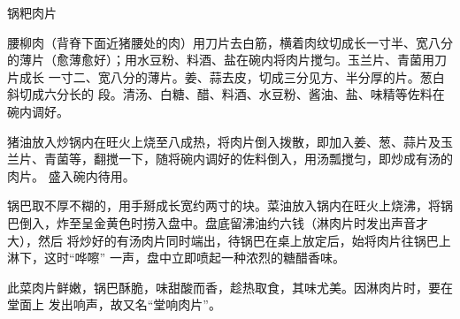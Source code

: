 \begin{recipe}{锅粑肉片}

\ingredients


\cooking

\step 腰柳肉（背脊下面近猪腰处的肉）用刀片去白筋，横着肉纹切成长一寸半、宽八分
的薄片（愈薄愈好）；用水豆粉、料酒、盐在碗内将肉片搅匀。玉兰片、青菌用刀片成长
一寸二、宽八分的薄片。姜、蒜去皮，切成三分见方、半分厚的片。葱白斜切成六分长的
段。清汤、白糖、醋、料酒、水豆粉、酱油、盐、味精等佐料在碗内调好。

\step 猪油放入炒锅内在旺火上烧至八成热，将肉片倒入拨散，即加入姜、葱、蒜片及玉
兰片、青菌等，翻搅一下，随将碗内调好的佐料倒入，用汤瓢搅匀，即炒成有汤的肉片。
盛入碗内待用。

\step 锅巴取不厚不糊的，用手掰成长宽约两寸的块。菜油放入锅内在旺火上烧沸，将锅
巴倒入，炸至呈金黄色时捞入盘中。盘底留沸油约六钱（淋肉片时发出声音才大），然后
将炒好的有汤肉片同时端出，待锅巴在桌上放定后，始将肉片往锅巴上淋下，这时“哗嚓”
一声，盘中立即喷起一种浓烈的糖醋香味。

\notes

此菜肉片鲜嫩，锅巴酥脆，味甜酸而香，趁热取食，其味尤美。因淋肉片时，要在堂面上
发出响声，故又名“堂响肉片”。

\end{recipe}

